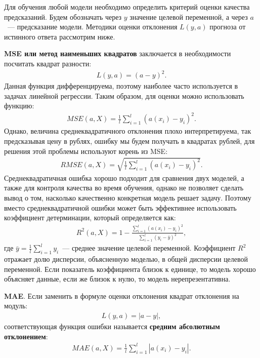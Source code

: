 \documentclass[12pt,a4paper]{article} %
\begin{document}
Для обучения любой модели необходимо определить критерий оценки качества предсказаний. Будем обозначать через $y$ значение целевой переменной, а через $a$~--- предсказание модели. Методики оценки отклонения $L(y,a)$ прогноза от истинного ответа рассмотрим ниже.

\textbf{MSE или метод наименьших квадратов} заключается в необходимости посчитать квадрат разности:
\begin{gather}\label{linregdiff1}
	L(y,a) = {(a-y)}^2.
\end{gather}
Данная функция дифференцируема, поэтому наиболее часто используется в задачах линейной регрессии. Таким образом, для оценки можно использовать функцию:
\begin{gather}\label{linregdiff2}
	MSE(a, X) = \frac{1}{l}\sum\limits_{i=1}^{l}{(a(x_i)-y_i)}^2.
\end{gather}
Однако, величина среднеквадратичного отклонения плохо интерпретируема, так предсказывая цену в рублях, ошибку мы будем получать в квадратах рублей, для решения этой проблемы используют корень из MSE:
\begin{gather}\label{linregdiff22}
	RMSE(a, X) =
	\sqrt{ \frac{1}{l}\sum\limits_{i=1}^{l}{(a(x_i)-y_i)}^2}.
\end{gather}
Среднеквадратичная ошибка хорошо подходит для сравнения двух моделей, а также для контроля качества во время обучения, однако не позволяет сделать вывод о том, насколько качественно конкретная модель решает задачу. Поэтому вместо среднеквадратичной ошибки может быть эффективнее использовать коэффициент детерминации, который определяется как:
\begin{gather}\label{linregdiff3}
	R^2(a, X) = 1 - \frac{\sum_{i=1}^{l}{(a(x_i)-y_i)}^2}{\sum_{i=1}^{l}{(y_i-\bar{y})}^2},
\end{gather}
где $\bar{y} = \frac{1}{l}\sum_{i=1}^{l}y_i$~--- среднее значение целевой переменной. Коэффициент $R^2$ отражает долю дисперсии, объясненную моделью, в общей дисперсии целевой переменной. Если показатель коэффициента близок к единице, то модель хорошо объясняет данные, если же близок к нулю, то модель нерепрезентативна.

\textbf{MAE}. Если заменить в формуле оценки отклонения квадрат отклонения на модуль:
\begin{gather}\label{linregdiff4}
	L(y,a) = |a-y|,
\end{gather}
соответствующая функция ошибки  называется \textbf{средним абсолютным отклонением}:
\begin{gather}\label{linregdiff5}
	MAE(a,X) = \frac{1}{l}\sum\limits_{i=1}^{l}|a(x_i)-y_i|.
\end{gather}
\end{document}
